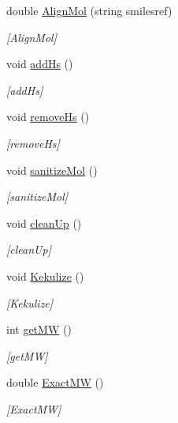 \begin{DoxyCompactItemize}
\item 
double \mbox{\hyperlink{class_molecule_a8c47d44f8436cb7d3741af6aeb734a37}{Align\+Mol}} (string smilesref)
\begin{DoxyCompactList}\small\item\em \mbox{[}Align\+Mol\mbox{]} \end{DoxyCompactList}\item 
void \mbox{\hyperlink{class_molecule_a4113a3e70e7bc6d994bf7c8f14d94c9b}{add\+Hs}} ()
\begin{DoxyCompactList}\small\item\em \mbox{[}add\+Hs\mbox{]} \end{DoxyCompactList}\item 
void \mbox{\hyperlink{class_molecule_aff4e7702feb85eb5d43b5ae89a504ca3}{remove\+Hs}} ()
\begin{DoxyCompactList}\small\item\em \mbox{[}remove\+Hs\mbox{]} \end{DoxyCompactList}\item 
void \mbox{\hyperlink{class_molecule_a1d3b07d426af616e861606727848d35e}{sanitize\+Mol}} ()
\begin{DoxyCompactList}\small\item\em \mbox{[}sanitize\+Mol\mbox{]} \end{DoxyCompactList}\item 
void \mbox{\hyperlink{class_molecule_ae9aeca03c03bbd36ab63c4a69e2ddc82}{clean\+Up}} ()
\begin{DoxyCompactList}\small\item\em \mbox{[}clean\+Up\mbox{]} \end{DoxyCompactList}\item 
void \mbox{\hyperlink{class_molecule_ac70bc19bc462d250f2c4de320bd3330c}{Kekulize}} ()
\begin{DoxyCompactList}\small\item\em \mbox{[}Kekulize\mbox{]} \end{DoxyCompactList}\item 
int \mbox{\hyperlink{class_molecule_afa532b75ee416a58bf7f628252522e65}{get\+MW}} ()
\begin{DoxyCompactList}\small\item\em \mbox{[}get\+MW\mbox{]} \end{DoxyCompactList}\item 
double \mbox{\hyperlink{class_molecule_abd7a0835ce83bffd2422df8cdfb5b163}{Exact\+MW}} ()
\begin{DoxyCompactList}\small\item\em \mbox{[}Exact\+MW\mbox{]} \end{DoxyCompactList}\item 

\end{DoxyCompactItemize}
